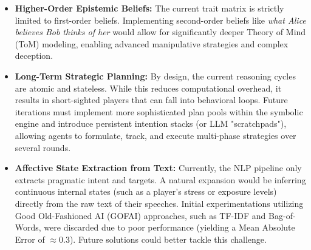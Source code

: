 \documentclass[12pt]{article}
\begin{document}
\begin{itemize}
    \item \textbf{Higher-Order Epistemic Beliefs:} The current trait matrix is strictly limited to first-order beliefs. Implementing second-order beliefs like \textit{what Alice believes Bob thinks of her} would allow for significantly deeper Theory of Mind (ToM) modeling, enabling advanced manipulative strategies and complex deception.
    \item \textbf{Long-Term Strategic Planning:} By design, the current reasoning cycles are atomic and stateless. While this reduces computational overhead, it results in short-sighted players that can fall into behavioral loops. Future iterations must implement more sophisticated plan pools within the symbolic engine and introduce persistent intention stacks (or LLM "scratchpads"), allowing agents to formulate, track, and execute multi-phase strategies over several rounds.
    \item \textbf{Affective State Extraction from Text:} Currently, the NLP pipeline only extracts pragmatic intent and targets. A natural expansion would be inferring continuous internal states (such as a player's stress or exposure levels) directly from the raw text of their speeches. Initial experimentations utilizing Good Old-Fashioned AI (GOFAI) approaches, such as TF-IDF and Bag-of-Words, were discarded due to poor performance (yielding a Mean Absolute Error of $\approx 0.3$). Future solutions could better tackle this challenge.
\end{itemize}


\end{document}
